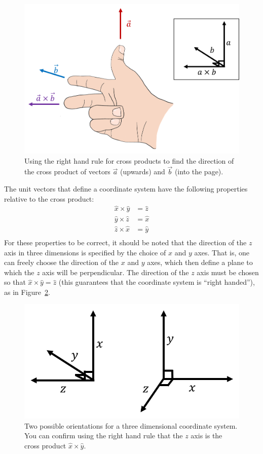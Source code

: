 \begin{figure}[!htbp]
\centering
\includegraphics[width=1\linewidth]{files/righthandrule-8ae8bedd142f4f76e321e2f318eae4aa.png}
\caption[]{Using the right hand rule for cross products to find the direction of the cross product of vectors $\vec a$ (upwards) and $\vec b$ (into the page).}
\label{fig:Vectors:righthandrule }
\end{figure}

The unit vectors that define a coordinate system have the following properties relative to the cross product:
\begin{align*}
\hat x \times \hat y &= \hat z\\
\hat y \times \hat z &= \hat x\\
\hat z \times \hat x &= \hat y\\
\end{align*}
For these properties to be correct, it should be noted that the direction of the $z$ axis in three dimensions is specified by the choice of $x$ and $y$ axes. That is, one can freely choose the direction of the $x$ and $y$ axes, which then define a plane to which the $z$ axis will be perpendicular. The direction of the $z$ axis must be chosen so that $\hat x \times \hat y = \hat z$ (this guarantees that the coordinate system is ``right handed''), as in Figure~\ref{fig:Vectors:xyzaxis}.

\begin{figure}[!htbp]
\centering
\includegraphics[width=0.625\linewidth]{files/xyzaxis-9e9577552478578827b53fb21afae42b.png}
\caption[]{Two possible orientations for a three dimensional coordinate system. You can confirm using the right hand rule that the $z$ axis is the cross product $\hat x \times \hat y$.}
\label{fig:Vectors:xyzaxis}
\end{figure}

